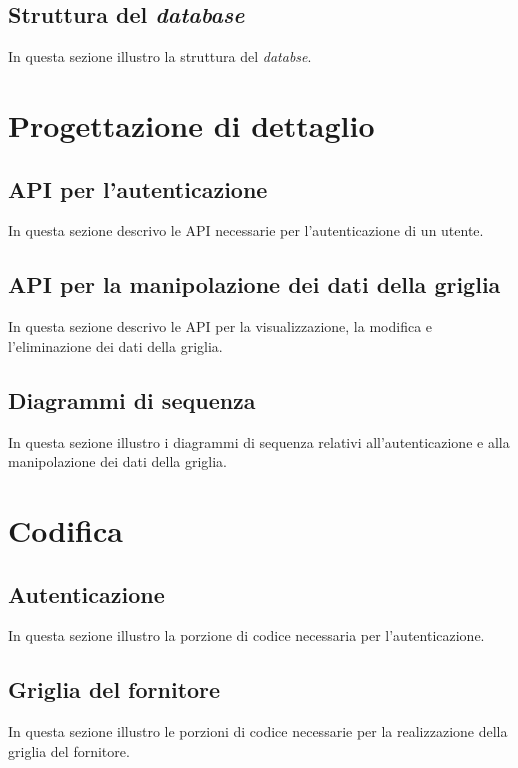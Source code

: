 \subsection{Struttura del \emph{database}}
In questa sezione illustro la struttura del \emph{databse}.

\section{Progettazione di dettaglio}

\subsection{API per l'autenticazione}
In questa sezione descrivo le API necessarie per l'autenticazione di un utente.

\subsection{API per la manipolazione dei dati della griglia}
In questa sezione descrivo le API per la visualizzazione, la modifica e l'eliminazione dei dati della griglia.

\subsection{Diagrammi di sequenza}
In questa sezione illustro i diagrammi di sequenza relativi all'autenticazione e alla manipolazione dei dati della griglia.

\section{Codifica}

\subsection{Autenticazione}
In questa sezione illustro la porzione di codice necessaria per l'autenticazione.

\subsection{Griglia del fornitore}
In questa sezione illustro le porzioni di codice necessarie per la realizzazione della griglia del fornitore.

